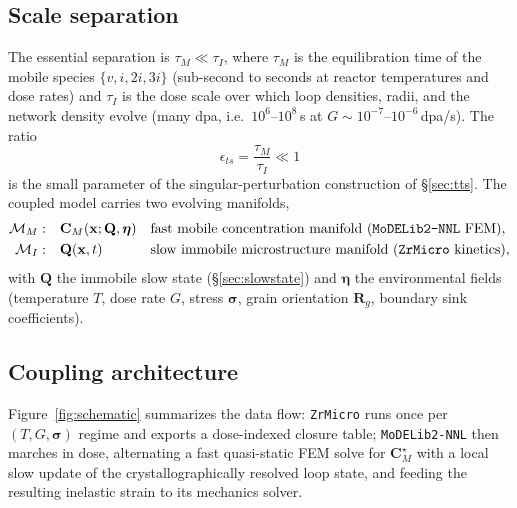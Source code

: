 \documentclass[11pt]{article}
\newcommand{\CM}{\mathbf{C}_{M}}
\newcommand{\sig}{\bm{\sigma}}
\newcommand{\ZrMicro}{\texttt{ZrMicro}}
\newcommand{\MoDELib}{\texttt{MoDELib2-NNL}}
\begin{document}
\subsection{Scale separation}

The essential separation is $\tau_{M}\ll\tau_{I}$, where $\tau_M$ is the
equilibration time of the mobile species $\{v,i,2i,3i\}$ (sub-second to seconds
at reactor temperatures and dose rates) and $\tau_I$ is the dose scale over which
loop densities, radii, and the network density evolve (many dpa, i.e.\
$10^{6}$--$10^{8}\,$s at $G\sim10^{-7}$--$10^{-6}\,$dpa/s). The ratio
\begin{equation}
    \epsilon_{ts} = \frac{\tau_M}{\tau_I} \ll 1
\end{equation}
is the small parameter of the singular-perturbation construction of
\S\ref{sec:tts}. The coupled model carries two evolving manifolds,
\begin{align}
    \mathcal{M}_{M}: \quad & \CM(\mathbf{x};\mathbf{Q},\bm{\eta})
    &&\text{fast mobile concentration manifold (\MoDELib{} FEM)}, \\
    \mathcal{M}_{I}: \quad & \mathbf{Q}(\mathbf{x},t)
    &&\text{slow immobile microstructure manifold (\ZrMicro{} kinetics)},
\end{align}
with $\mathbf{Q}$ the immobile slow state (\S\ref{sec:slowstate}) and
$\bm{\eta}$ the environmental fields (temperature $T$, dose rate $G$, stress
$\sig$, grain orientation $\mathbf{R}_g$, boundary sink coefficients).

\subsection{Coupling architecture}

Figure~\ref{fig:schematic} summarizes the data flow: \ZrMicro{} runs once per
$(T,G,\sig)$ regime and exports a dose-indexed closure table; \MoDELib{} then
marches in dose, alternating a fast quasi-static FEM solve for $\CM^\star$ with a
local slow update of the crystallographically resolved loop state, and feeding
the resulting inelastic strain to its mechanics solver.
\end{document}
